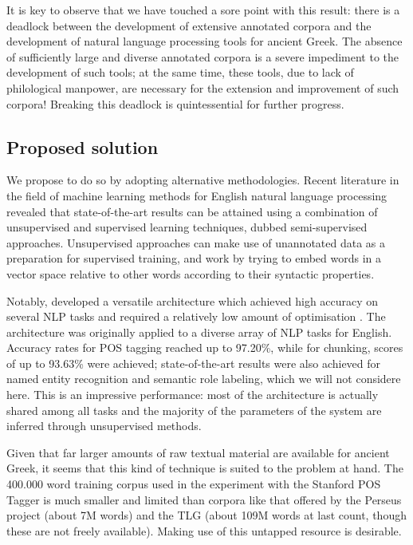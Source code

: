 It is key to observe that we have touched a sore point with this
result: there is a deadlock between the development of extensive
annotated corpora and the development of natural language processing
tools for ancient Greek. The absence of sufficiently large and diverse
annotated corpora is a severe impediment to the development of such
tools; at the same time, these tools, due to lack of philological
manpower, are necessary for the extension and improvement of such
corpora! Breaking this deadlock is quintessential for further progress.

\subsection{Proposed solution}

We propose to do so by adopting alternative methodologies. Recent
literature in the field of machine learning methods for English
natural language processing revealed that state-of-the-art results
can be attained using a combination of unsupervised and supervised
learning techniques, dubbed semi-supervised approaches. Unsupervised
approaches can make use of unannotated data as a preparation for
supervised training, and work by trying to embed words in a vector
space relative to other words according to their syntactic properties.

Notably, \citeauthor{collobert2008} developed a versatile architecture
which achieved high accuracy on several NLP tasks and required a
relatively low amount of optimisation
\citep{collobert2008,collobert-2011}. The architecture was originally
applied to a diverse array of NLP tasks for English. Accuracy rates
for POS tagging reached up to 97.20\%, while for chunking, scores of
up to 93.63\% were achieved; state-of-the-art results were also
achieved for named entity recognition and semantic role labeling,
which we will not considere here. This is an impressive performance:
most of the architecture is actually shared among all tasks and the
majority of the parameters of the system are inferred through
unsupervised methods.

Given that far larger amounts of raw textual material are available
for ancient Greek, it seems that this kind of technique is suited to
the problem at hand. The 400.000 word training corpus used in the
experiment with the Stanford POS Tagger is much smaller and limited
than corpora like that offered by the Perseus project (about 7M words)
and the TLG (about 109M words at last count, though these are not
freely available). Making use of this untapped resource is
desirable. 

